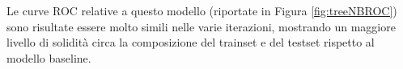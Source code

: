 Le curve ROC relative a questo modello (riportate in Figura \ref{fig:treeNBROC}) sono risultate essere molto simili nelle varie iterazioni, mostrando un maggiore livello di solidità circa la composizione del trainset e del testset rispetto al modello baseline.
\begin{figure}
	\centering
	\quad
	\quad
	\quad
	\quad
	\quad

\end{figure}
